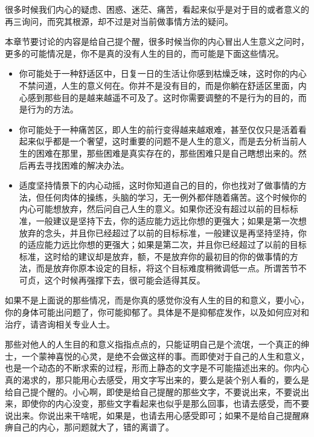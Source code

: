 \documentclass[12pt,oneside]{book}
\begin{document}
很多时候我们内心的疑虑、困惑、迷茫、痛苦，看起来似乎是对于目的或者意义的再三询问，而究其根源，却不过是对当前做事情方法的疑问。

本章节要讨论的内容是给自己提个醒，很多时候当你的内心冒出人生意义之问时，更多的可能情况是，你不是真的没有人生的目的，而可能是下面这些情况。

\begin{itemize}
\item 你可能处于一种舒适区中，日复一日的生活让你感到枯燥乏味，这时你的内心不禁问道，人生的意义何在。你并不是没有目的，而是你躺在舒适区里面，内心感到那些目的是越来越遥不可及了。这时你需要调整的不是行为的目的，而是行为的方法。

\item 你可能处于一种痛苦区，即人生的前行变得越来越艰难，甚至仅仅只是活着看起来似乎都是一个奢望，这时重要的问题不是人生的意义，而是去分析当前人生的困难在那里，那些困难是真实存在的，那些困难只是自己瞎想出来的。然后再去寻找困难的解决办法。


\item 适度坚持情景下的内心动摇，这时你知道自己的目的，你也找对了做事情的方法，但任何肉体的操练，头脑的学习，无一例外都伴随着痛苦。这个时候你的内心可能想放弃，然后问自己人生的意义。如果你还没有超过以前的目标标准，一般建议是坚持下去，你的适应能力远比你想的更强大；如果是第一次想放弃的念头，并且你已经超过了以前的目标标准，一般建议是再坚持坚持，你的适应能力远比你想的更强大；如果是第二次，并且你已经超过了以前的目标标准，这时给的建议却是放弃，额，不是放弃你的最初目的你的做事情的方法，而是放弃你原本设定的目标，将这个目标难度稍微调低一点。所谓苦节不可贞，这个时候再强撑下去，很可能会适得其反。


\end{itemize}

如果不是上面说的那些情况，而是你真的感觉你没有人生的目的和意义，要小心，你的身体可能出问题了，你可能抑郁了。具体是不是抑郁症发作，以及如何应对和治疗，请咨询相关专业人士。

那些对他人的人生目的和意义指指点点的，只能证明自己是个流氓，一个真正的绅士，一个蒙神喜悦的心灵，是绝不会做这样的事。而即使对于自己的人生和意义，也是一个动态的不断求索的过程，形而上静态的文字是不可能描述出来的。你内心真的渴求的，那只能用心去感受，用文字写出来的，要么是装个别人看的，要么是给自己提个醒的。小心啊，即使是给自己提醒的那些文字，不要说出来，不要说出来，即使你的内心没变，那些文字看起来也似乎是那么回事，也请去感受，而不要说出来。你说出来干啥呢，如果是，也请去用心感受即可；如果不是给自己提醒麻痹自己的内心，那问题就大了，错的离谱了。
\end{document}
